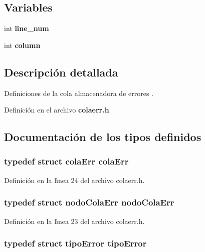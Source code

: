 \subsection*{Variables}
\begin{CompactItemize}
\item 
int {\bf line\_\-num}
\item 
int {\bf column}
\end{CompactItemize}


\subsection{Descripci\'{o}n detallada}
Definiciones de la cola almacenadora de errores . 



Definici\'{o}n en el archivo {\bf colaerr.h}.

\subsection{Documentaci\'{o}n de los tipos definidos}
\subsubsection{\setlength{\rightskip}{0pt plus 5cm}typedef struct {\bf cola\-Err} {\bf cola\-Err}}\label{colaerr_8h_a3}




Definici\'{o}n en la l\'{\i}nea 24 del archivo colaerr.h.
\subsubsection{\setlength{\rightskip}{0pt plus 5cm}typedef struct {\bf nodo\-Cola\-Err} {\bf nodo\-Cola\-Err}}\label{colaerr_8h_a2}




Definici\'{o}n en la l\'{\i}nea 23 del archivo colaerr.h.
\subsubsection{\setlength{\rightskip}{0pt plus 5cm}typedef struct {\bf tipo\-Error} {\bf tipo\-Error}}\label{colaerr_8h_a4}




